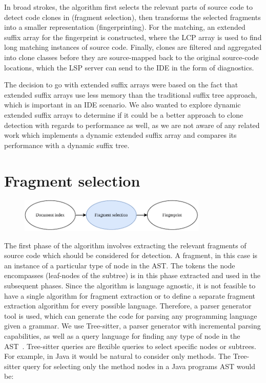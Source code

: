 In broad strokes, the algorithm first selects the relevant parts of source code to detect
code clones in (fragment selection), then transforms the selected fragments into a smaller
representation (fingerprinting). For the matching, an extended suffix array for the
fingerprint is constructed, where the LCP array is used to find long matching instances of
source code. Finally, clones are filtered and aggregated into clone classes before they
are source-mapped back to the original source-code locations, which the LSP server can
send to the IDE in the form of diagnostics.

The decision to go with extended suffix arrays were based on the fact that extended suffix
arrays use less memory than the traditional suffix tree approach, which is important in an
IDE scenario. We also wanted to explore dynamic extended suffix arrays to determine if it
could be a better approach to clone detection with regards to performance as well, as we
are not aware of any related work which implements a dynamic extended suffix array and
compares its performance with a dynamic suffix tree.

\section{Fragment selection}

\begin{figure}[H]
    \begin{center}
        \includegraphics[width=0.8\textwidth]{figures/phases/phases_fragmentselection.drawio.pdf}
    \end{center}
\end{figure}

The first phase of the algorithm involves extracting the relevant fragments of source code
which should be considered for detection. A fragment, in this case is an instance of a
particular type of node in the AST. The tokens the node encompasses (leaf-nodes of the
subtree) is in this phase extracted and used in the subsequent phases. Since the algorithm
is language agnostic, it is not feasible to have a single algorithm for fragment
extraction or to define a separate fragment extraction algorithm for every possible
language. Therefore, a parser generator tool is used, which can generate the code for
parsing any programming language given a grammar. We use Tree-sitter, a parser generator
with incremental parsing capabilities, as well as a query language for finding any type of
node in the AST~\cite{treesitter}. Tree-sitter queries are flexible queries to select
specific nodes or subtrees. For example, in Java it would be natural to consider only
methods. The Tree-sitter query for selecting only the method nodes in a Java programs AST
would be:

